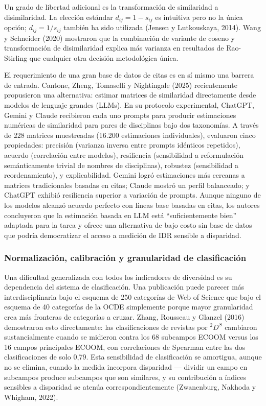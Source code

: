 \documentclass[
]{article}
\begin{document}
Un grado de libertad adicional es la transformación de similaridad a
disimilaridad. La elección estándar \(d_{ij} = 1 - s_{ij}\) es intuitiva
pero no la única opción; \(d_{ij} = 1/s_{ij}\) también ha sido utilizada
(Jensen y Lutkouskaya, 2014). Wang y Schneider (2020) mostraron que la
combinación de variante de coseno y transformación de disimilaridad
explica más varianza en resultados de Rao-Stirling que cualquier otra
decisión metodológica única.

El requerimiento de una gran base de datos de citas es en sí mismo una
barrera de entrada. Cantone, Zheng, Tomaselli y Nightingale (2025)
recientemente propusieron una alternativa: estimar matrices de
similaridad directamente desde modelos de lenguaje grandes (LLMs). En su
protocolo experimental, ChatGPT, Gemini y Claude recibieron cada uno
prompts para producir estimaciones numéricas de similaridad para pares
de disciplinas bajo dos taxonomías. A través de 228 matrices muestreadas
(16.200 estimaciones individuales), evaluaron cinco propiedades:
precisión (varianza inversa entre prompts idénticos repetidos), acuerdo
(correlación entre modelos), resiliencia (sensibilidad a reformulación
semánticamente trivial de nombres de disciplinas), robustez
(sensibilidad a reordenamiento), y explicabilidad. Gemini logró
estimaciones más cercanas a matrices tradicionales basadas en citas;
Claude mostró un perfil balanceado; y ChatGPT exhibió resiliencia
superior a variación de prompts. Aunque ninguno de los modelos alcanzó
acuerdo perfecto con líneas base basadas en citas, los autores
concluyeron que la estimación basada en LLM está ``suficientemente
bien'' adaptada para la tarea y ofrece una alternativa de bajo costo sin
base de datos que podría democratizar el acceso a medición de IDR
sensible a disparidad.

\hypertarget{normalizaciuxf3n-calibraciuxf3n-y-granularidad-de-clasificaciuxf3n}{%
\subsubsection{Normalización, calibración y granularidad de
clasificación}\label{normalizaciuxf3n-calibraciuxf3n-y-granularidad-de-clasificaciuxf3n}}

Una dificultad generalizada con todos los indicadores de diversidad es
su dependencia del sistema de clasificación. Una publicación puede
parecer más interdisciplinaria bajo el esquema de 250 categorías de Web
of Science que bajo el esquema de 40 categorías de la OCDE simplemente
porque mayor granularidad crea más fronteras de categorías a cruzar.
Zhang, Rousseau y Glanzel (2016) demostraron esto directamente: las
clasificaciones de revistas por \({}^2D^S\) cambiaron sustancialmente
cuando se midieron contra los 68 subcampos ECOOM versus los 16 campos
principales ECOOM, con correlaciones de Spearman entre las dos
clasificaciones de solo 0,79. Esta sensibilidad de clasificación se
amortigua, aunque no se elimina, cuando la medida incorpora disparidad
--- dividir un campo en subcampos produce subcampos que son similares, y
su contribución a índices sensibles a disparidad se atenúa
correspondientemente (Zwanenburg, Nakhoda y Whigham, 2022).
\end{document}
